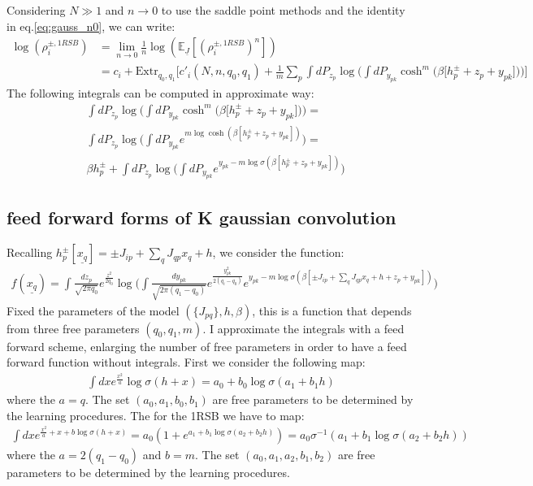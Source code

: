 \documentclass{article}
\begin{document}
Considering $N \gg 1$ and $n\rightarrow 0$ to use the saddle point methods and the identity in eq.\ref{eq:gauss_n0}, we can write:
\begin{align}
\log (\rho_i^{\pm, 1RSB}) & = 
\lim_{n\rightarrow 0} \frac{1}{n} \log \left(\mathbb{E}_{\underline{J}} \left[(\rho_i^{\pm, 1RSB})^n \right]  \right) \\
& = c_i +  \text{Extr}_{q_0, q_1} \biggl[ c'_i(N,n,q_0, q_1) 
+ \frac{1}{m} \sum_{p} \int dP_{z_p} \log \biggl( \int dP_{y_{pk}} \cosh^m\biggl(\beta \bigl[h_p^{\pm}+ z_p + y_{pk}\bigl]  \biggr)  \biggr)
\biggr]
\end{align}
The following integrals can be computed in approximate way:
\begin{align}
& \int dP_{z_p} \log \biggl( \int dP_{y_{pk}}  \cosh^m\biggl(\beta \bigl[h_p^{\pm}+ z_p +  y_{pk}\bigl]  \biggr)  \biggr) 
 = \\
& \int dP_{z_p} \log \biggl( \int dP_{y_{pk}} e^{ m \log \cosh \left(\beta \left[h_p^{\pm}+  z_p +  y_{pk}\right]  \right) } \biggr) 
 = \\
& \beta h_{p}^{\pm} + \int dP_{z_p} \log \biggl( \int dP_{y_{pk}} e^{ y_{pk} - m \log \sigma \left(\beta \left[h_p^{\pm}+ z_p + y_{pk}\right]  \right) } \biggr) 
\end{align}
\subsection{feed forward forms of K gaussian convolution}
Recalling $h_p^{\pm}[\underline{x_q}] =\pm J_{ip} + \sum_{q} J_{qp} x_q + h$, we consider the function:
\begin{align}
f(\underline{x_q}) = \int \frac{dz_p}{\sqrt{2\pi q_0}}e^{\frac{z^2}{2q_0}} \log \biggl( \int \frac{dy_{pk}}{\sqrt{2\pi (q_1-q_0)}}e^{\frac{y_{pk}^2}{2 (q_i-q_0)}} e^{ y_{pk} - m \log \sigma \left(\beta \left[\pm J_{ip} + \sum_{q} J_{qp} x_q + h + z_p + y_{pk}\right]  \right) } \biggr) 
\end{align}
Fixed the parameters of the model $(\{J_{pq}\}, h, \beta)$, this is a function that depends from three free parameters $(q_0, q_1, m)$. I approximate the integrals with a feed forward scheme, enlarging the number of free parameters in order to have a feed forward function without integrals. First we consider the following map:
\begin{align}
    \int dx e^{\frac{x^2}{a}} \log\sigma (h + x) = a_0 +b_0 \log \sigma (a_1 + b_1 h) 
\end{align}
where the $a=q$. The set $(a_0, a_1, b_0, b_1)$ are free parameters to be determined by the learning procedures. The for the 1RSB we have to map:
\begin{align}
    \int dx e^{\frac{x^2}{a} + x + b \log\sigma (h + x)} = a_0 (1 + e^{a_1 + b_1 \log \sigma (a_2 + b_2 h) }) = a_0 \sigma^{-1}(a_1 + b_1 \log \sigma (a_2 + b_2 h) )
\end{align}
where the $a=2(q_1-q_0)$ and $b=m$. The set $(a_0, a_1, a_2, b_1, b_2)$ are free parameters to be determined by the learning procedures.
\end{document}
